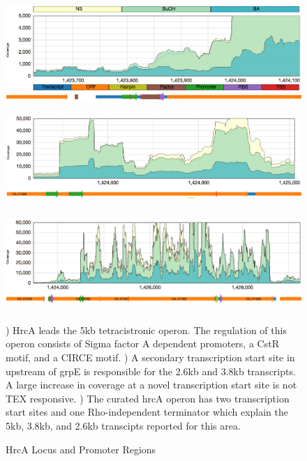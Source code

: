 \begin{figure}
{\includegraphics[width=\textwidth,height=1.5in]{images/Assembly/Examples/HrcA/HrcA-TSS.png}
\label{fig:5.16a}}
{\includegraphics[width=\textwidth,height=1.5in]{images/Assembly/Examples/HrcA/GrpE-TSS.png}
\label{fig:5.16b}}
{\includegraphics[width=\textwidth,height=1.5in]{images/Assembly/Examples/HrcA/HrcA-operon-curated.png}
\label{fig:5.16c}}
\caption{HrcA Locus and Promoter Regions}
) HrcA leads the 5kb tetracistronic operon. The regulation of this operon consists of Sigma factor A dependent promoters, a CstR motif, and a CIRCE motif. ) A secondary transcription start site in upstream of grpE is responsible for the 2.6kb and 3.8kb transcripts. A large increase in coverage at a novel transcription start site is not TEX responsive. ) The curated hrcA operon has two transcription start sites and one Rho-independent terminator which explain the 5kb, 3.8kb, and 2.6kb transcipts reported for this area.
\end{figure}


